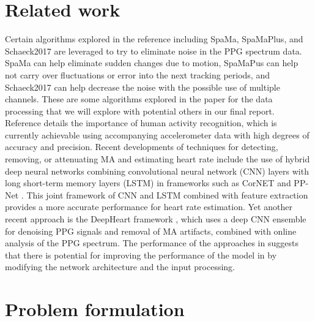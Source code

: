 \documentclass[12pt, conference]{IEEEtran}
\begin{document}
\section{Related work}
Certain algorithms explored in the reference \cite{reiss2019deep} including SpaMa, SpaMaPlus, and Schaeck2017 are leveraged to try to eliminate noise in the PPG spectrum data. SpaMa can help eliminate sudden changes due to motion, SpaMaPus can help not carry over fluctuations or error into the next tracking periods, and Schaeck2017 can help decrease the noise with the possible use of multiple channels. These are some algorithms explored in the paper for the data processing that we will explore with potential others in our final report. Reference \cite{brophy2020optimised} details the importance of human activity recognition, which is currently achievable using accompanying accelerometer data with high degrees of accuracy and precision. Recent developments of techniques for detecting, removing, or attenuating MA and estimating heart rate include the use of hybrid deep neural networks combining convolutional neural network (CNN) layers with long short-term memory layers (LSTM) in frameworks such as CorNET \cite{biswas2019cornet} and PP-Net \cite{panwar2020pp}. This joint framework of CNN and LSTM combined with feature extraction provides a more accurate performance for heart rate estimation. Yet another recent approach is the DeepHeart framework \cite{chang2021deepheart}, which uses a deep CNN ensemble for denoising PPG signals and removal of MA artifacts, combined with online analysis of the PPG spectrum. The performance of the approaches in \cite{biswas2019cornet,panwar2020pp,chang2021deepheart} suggests that there is potential for improving the performance of the model in \cite{reiss2019deep} by modifying the network architecture and the input processing.

\section{Problem formulation}
\end{document}
